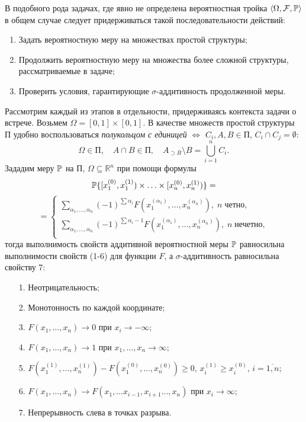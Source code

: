\begin{remark}
В подобного рода задачах, где явно не определена вероятностная тройка $\langle \Omega, \mathcal{F}, \mathrm{{\mathbb P}} \rangle$ в общем случае следует придерживаться такой последовательности действий: 
\begin{enumerate}
\item Задать вероятностную меру на множествах простой структуры;
\item Продолжить вероятностную меру на множества более сложной структуры, рассматриваемые в задаче;  
\item Проверить условия, гарантирующие $\sigma$-аддитивность продолженной меры.   
\end{enumerate}
Рассмотрим каждый из этапов в отдельности, придерживаясь контекста задачи о встрече. Возьмем $\Omega = [0,1] \times [0,1]$. В качестве множеств простой структуры $\text{П}$ удобно воспользоваться \textit{полукольцом с единицей} $\Leftrightarrow$ $C_i, A, B \in \text{П}$, $C_i \cap C_j  = \emptyset$:
\[
\Omega \in \text{П},  \quad A\cap B \in \text{П}, \quad A_{\supset B} \setminus B = \bigcup \limits_{i=1}^n C_i.
\]
Зададим меру $\mathrm{{\mathbb P}}$ на $\text{П}$, $\Omega \subseteq \mathbb{R}^n$ при помощи формулы 
\[
\mathrm{{\mathbb P}}\{ [x_1^{(0)}, x_1^{(1)})\times \ldots \times [x_n^{(0)},  x_n^{(1)})  \} = 
\]
\[\tag{1} =
\begin{cases}
\sum \limits_{\alpha_1, \ldots, \alpha_n} (-1)^{\sum \alpha_i} F\left(x_1^{(\alpha_1)} ,\ldots, x_n^{(\alpha_n)}\right),  \; n \; \text{четно}, \\
\sum \limits_{\alpha_1, \ldots, \alpha_n} (-1)^{\sum \alpha_i - 1} F\left(x_1^{(\alpha_1)} ,\ldots, x_n^{(\alpha_n)} \right) ,  \; n \; \text{нечетно},\\
\end{cases}
\]
тогда выполнимость свойств аддитивной вероятностной меры $\mathrm{{\mathbb P}}$ равносильна  выполнимости свойств (1-6) для функции $F$, а $\sigma$-аддитивность равносильна свойству 7: 

\begin{enumerate}
\item[1.] Неотрицательность;
\item[2.] Монотонность по каждой координате;
\item[3.] $F(x_1, \ldots, x_n) \to 0$ при $x_i \to -\infty$;
\item[4.] $F(x_1, \ldots, x_n) \to 1$ при $x_1, \ldots, x_n  \to \infty$;
\item[5.] $F(x_1^{(1)},...,x_n^{(1)}) - F(x_1^{(0)},...,x_n^{(0)}) \geq 0, \, x_i^{(1)}\geq x_i^{(0)}, \, i=\overline{1,n}$;
\item[6.] $F(x_1, \ldots, x_n) \to  F(x_1, \ldots x_{i-1}, x_{i+1}  \ldots , x_n)$ при $x_i \to \infty$;
\item[7.] Непрерывность слева в точках разрыва.
\end{enumerate} 


\end{remark}
